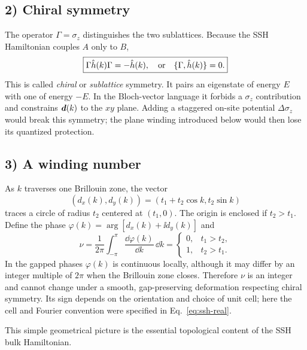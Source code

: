 \subsection*{2) Chiral symmetry}
The operator $\Gamma=\sigma_z$ distinguishes the two sublattices. Because the SSH Hamiltonian couples $A$ only to $B$,
\begin{equation}
 \boxed{\Gamma\hat{h}(k)\Gamma=-\hat{h}(k),\quad \text{or}\quad
 \{\Gamma,\hat{h}(k)\}=0.}
\end{equation}
This is called \emph{chiral} or \emph{sublattice} symmetry. It pairs an eigenstate of energy $E$ with one of energy $-E$. In the Bloch-vector language it forbids a $\sigma_z$ contribution and constrains $\bm{d}(k)$ to the $xy$ plane. Adding a staggered on-site potential $\Delta\sigma_z$ would break this symmetry; the plane winding introduced below would then lose its quantized protection.

\subsection*{3) A winding number}
As $k$ traverses one Brillouin zone, the vector
\begin{equation}
 (d_x(k),d_y(k))=(t_1+t_2\cos k,t_2\sin k)
\end{equation}
traces a circle of radius $t_2$ centered at $(t_1,0)$. The origin is enclosed if $t_2>t_1$. Define the phase $\varphi(k)=\arg[d_x(k)+\ii d_y(k)]$ and
\begin{equation}\label{eq:ssh-wind}
\boxed{\nu=\frac1{2\pi}\int_{-\pi}^{\pi}\frac{\dd\varphi(k)}{\dd k}\,\dd k
 =\begin{cases}0,&t_1>t_2,\\1,&t_2>t_1.\end{cases}}
\end{equation}
In the gapped phases $\varphi(k)$ is continuous locally, although it may differ by an integer multiple of $2\pi$ when the Brillouin zone closes. Therefore $\nu$ is an integer and cannot change under a smooth, gap-preserving deformation respecting chiral symmetry. Its sign depends on the orientation and choice of unit cell; here the cell and Fourier convention were specified in Eq.~\eqref{eq:ssh-real}.

\begin{center}
\end{center}
This simple geometrical picture is the essential topological content of the SSH bulk Hamiltonian.


